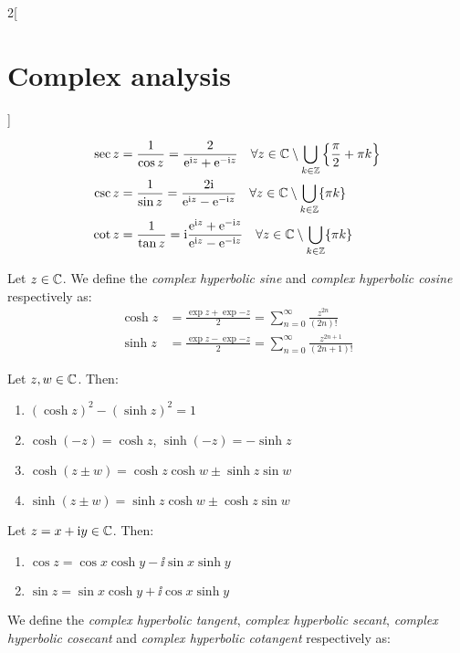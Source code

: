 \documentclass[../../../main.tex]{subfiles}
\begin{document}
\begin{multicols}{2}[\section{Complex analysis}]
\begin{definition}
\begin{align*}
      \sec z & = \frac{1}{\cos z}=\frac{2}{\mathrm{e}^{\mathrm{i} z}+\mathrm{e}^{-\mathrm{i} z}}\quad \forall z\in\mathbb{C}\setminus\bigcup_{k\in\mathbb{Z}}\left\{\frac{\pi}{2}+\pi k\right\}                                 \\
      \csc z & = \frac{1}{\sin z}=\frac{2\mathrm{i}}{\mathrm{e}^{\mathrm{i} z}-\mathrm{e}^{-\mathrm{i} z}}\quad\forall z\in\mathbb{C}\setminus\bigcup_{k\in\mathbb{Z}}\{\pi k\}                                                        \\
      \cot z & = \frac{1}{\tan z}=\mathrm{i}\frac{\mathrm{e}^{\mathrm{i} z}+\mathrm{e}^{-\mathrm{i} z}}{\mathrm{e}^{\mathrm{i} z}-\mathrm{e}^{-\mathrm{i} z}}\quad\forall z\in\mathbb{C}\setminus\bigcup_{k\in\mathbb{Z}}\{\pi k\}
    \end{align*}
  \end{definition}
  \begin{definition}
    Let $z\in \mathbb{C}$. We define the \emph{complex hyperbolic sine} and \emph{complex hyperbolic cosine} respectively as:
    \begin{align*}
      \cosh z & =\frac{\exp{z}+\exp{-z}}{2}=\sum_{n=0}^\infty\frac{z^{2n}}{(2n)!}     \\
      \sinh z & =\frac{\exp{z}-\exp{-z}}{2}=\sum_{n=0}^\infty\frac{z^{2n+1}}{(2n+1)!}
    \end{align*}
  \end{definition}
  \begin{proposition}
    Let $z,w\in\mathbb{C}$. Then:
    \begin{enumerate}
      \item ${\left(\cosh z\right)}^2-{\left(\sinh z\right)}^2=1$
      \item $\cosh(-z)=\cosh z$, $\sinh(-z)=-\sinh z$
      \item $\cosh{(z \pm w)} = \cosh z \cosh w \pm \sinh z \sin w$
      \item $\sinh{(z \pm w)} = \sinh z \cosh w \pm \cosh z \sin w$
    \end{enumerate}
  \end{proposition}
  \begin{proposition}
    Let $z=x+\mathrm{i} y\in \mathbb{C}$. Then:
    \begin{enumerate}
      \item $\cos z = \cos x \cosh y - \ii \sin x \sinh y$
      \item $\sin z = \sin x \cosh y + \ii \cos x \sinh y$
    \end{enumerate}
  \end{proposition}
  \begin{definition}
    We define the \emph{complex hyperbolic tangent}, \emph{complex hyperbolic secant}, \emph{complex hyperbolic cosecant} and \emph{complex hyperbolic cotangent} respectively as:

\end{definition}
\end{multicols}
\end{document}
